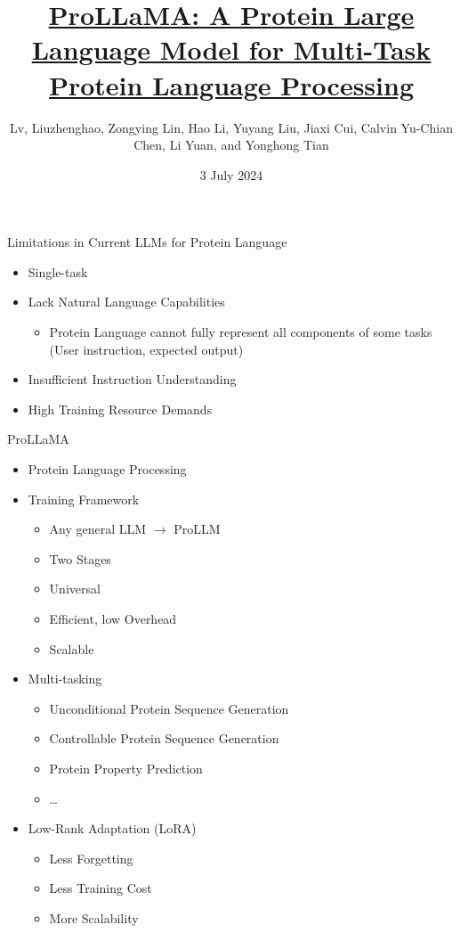 \documentclass[dvipsnames,
hyperref={citecolor=blue}
]{beamer}
\title[ProLLaMA]
{\href{https://doi.org/10.48550/arXiv.2402.16445}{ProLLaMA: A Protein Large Language Model for Multi-Task Protein Language Processing}}
\author[Liuzhenghao Lv et al.]{Lv, Liuzhenghao, Zongying Lin, Hao Li, Yuyang Liu, Jiaxi Cui, Calvin Yu-Chian Chen, Li Yuan, and Yonghong Tian}
\date{3 July 2024}
\begin{document}
\begin{frame}
\titlepage
\end{frame}


\begin{frame}{Limitations in Current LLMs for Protein Language}
	\begin{itemize}
		\item Single-task
		\item Lack Natural Language Capabilities
		\begin{itemize}
			\item Protein Language cannot fully represent all components of some tasks (User instruction, expected output)
		\end{itemize}
		\item Insufficient Instruction Understanding
		\item High Training Resource Demands
	\end{itemize}
\end{frame}

\begin{frame}{ProLLaMA}
	\begin{itemize}
		\item Protein Language Processing
		\item Training Framework
		\begin{itemize}
			\item Any general LLM $\rightarrow$ ProLLM
			\item Two Stages
			\item Universal
			\item Efficient, low Overhead
			\item Scalable
		\end{itemize}
		\item Multi-tasking
		\begin{itemize}
			\item Unconditional Protein Sequence Generation
			\item Controllable Protein Sequence Generation
			\item Protein Property Prediction
			\item \dots
		\end{itemize}
		\item %
		Low-Rank Adaptation (LoRA)
		\begin{itemize}
			\item Less Forgetting
			\item Less Training Cost
			\item More Scalability
		\end{itemize}
	\end{itemize}
\end{frame}
\end{document}
